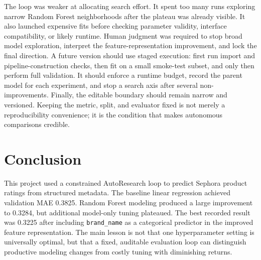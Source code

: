 The loop was weaker at allocating search effort. It spent too many runs exploring narrow Random Forest neighborhoods after the plateau was already visible. It also launched expensive fits before checking parameter validity, interface compatibility, or likely runtime. Human judgment was required to stop broad model exploration, interpret the feature-representation improvement, and lock the final direction. A future version should use staged execution: first run import and pipeline-construction checks, then fit on a small smoke-test subset, and only then perform full validation. It should enforce a runtime budget, record the parent model for each experiment, and stop a search axis after several non-improvements. Finally, the editable boundary should remain narrow and versioned. Keeping the metric, split, and evaluator fixed is not merely a reproducibility convenience; it is the condition that makes autonomous comparisons credible.

\section{Conclusion}

This project used a constrained AutoResearch loop to predict Sephora product ratings from structured metadata. The baseline linear regression achieved validation MAE 0.3825. Random Forest modeling produced a large improvement to 0.3284, but additional model-only tuning plateaued. The best recorded result was 0.3225 after including \texttt{brand\_name} as a categorical predictor in the improved feature representation. The main lesson is not that one hyperparameter setting is universally optimal, but that a fixed, auditable evaluation loop can distinguish productive modeling changes from costly tuning with diminishing returns.
